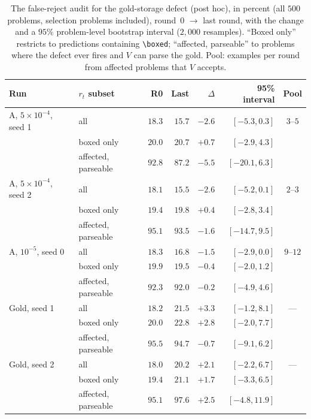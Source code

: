 \documentclass[runningheads]{llncs}
\begin{document}
\begin{table}[!htb]
\caption{The false-reject audit for the gold-storage defect (post hoc), in
percent (all $500$ problems, selection problems included), round~0 $\to$ last round, with the change and a $95\%$ problem-level bootstrap interval ($2{,}000$
resamples). ``Boxed only'' restricts to predictions containing
\texttt{\textbackslash boxed}; ``affected, parseable'' to problems where the
defect ever fires and $V$ can parse the gold. Pool: examples per round from
affected problems that $V$ accepts.}
\label{tab:rt}
\centering
\footnotesize
\setlength{\tabcolsep}{4pt}
\begin{tabular}{llrrrrc}
\toprule
Run & $r_t$ subset & R0 & Last & $\Delta$ & 95\% interval & Pool \\
\midrule
A, $5\times10^{-4}$, seed 1 & all & $18.3$ & $15.7$ & $-2.6$ & $[-5.3, 0.3]$ & $3$--$5$ \\
 & boxed only & $20.0$ & $20.7$ & $+0.7$ & $[-2.9, 4.3]$ & \\
 & affected, parseable & $92.8$ & $87.2$ & $-5.5$ & $[-20.1, 6.3]$ & \\
A, $5\times10^{-4}$, seed 2 & all & $18.1$ & $15.5$ & $-2.6$ & $[-5.2, 0.1]$ & $2$--$3$ \\
 & boxed only & $19.4$ & $19.8$ & $+0.4$ & $[-2.8, 3.4]$ & \\
 & affected, parseable & $95.1$ & $93.5$ & $-1.6$ & $[-14.7, 9.5]$ & \\
A, $10^{-5}$, seed 0 & all & $18.3$ & $16.8$ & $-1.5$ & $[-2.9, 0.0]$ & $9$--$12$ \\
 & boxed only & $19.9$ & $19.5$ & $-0.4$ & $[-2.0, 1.2]$ & \\
 & affected, parseable & $92.3$ & $92.0$ & $-0.2$ & $[-4.9, 4.6]$ & \\
Gold, seed 1 & all & $18.2$ & $21.5$ & $+3.3$ & $[-1.2, 8.1]$ & --- \\
 & boxed only & $20.0$ & $22.8$ & $+2.8$ & $[-2.0, 7.7]$ & \\
 & affected, parseable & $95.5$ & $94.7$ & $-0.7$ & $[-9.1, 6.2]$ & \\
Gold, seed 2 & all & $18.0$ & $20.2$ & $+2.1$ & $[-2.2, 6.7]$ & --- \\
 & boxed only & $19.4$ & $21.1$ & $+1.7$ & $[-3.3, 6.5]$ & \\
 & affected, parseable & $95.1$ & $97.6$ & $+2.5$ & $[-4.8, 11.9]$ & \\
\bottomrule
\end{tabular}
\end{table}
\end{document}
